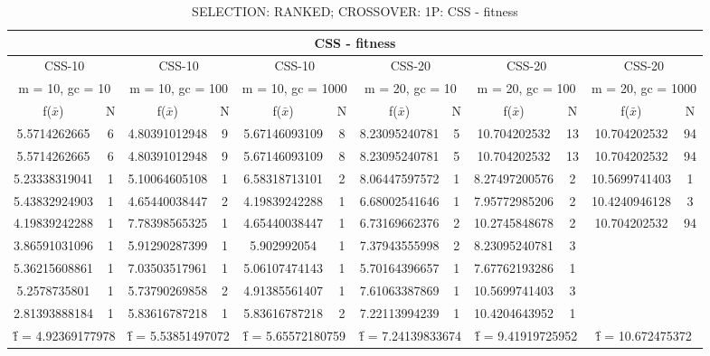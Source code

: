 \begin{table}[H]
	\centering
	\caption{SELECTION: RANKED; CROSSOVER: 1P: CSS - fitness}
	\begin{adjustbox}{width=1\textwidth}
		\begin{tabular}{ |c|c||c|c||c|c||c|c||c|c||c|c| }
			\hline
			\multicolumn{12}{|c|}{CSS - fitness} \\
			\hline
			\multicolumn{2}{|c||}{CSS-10} & \multicolumn{2}{c||}{CSS-10} & \multicolumn{2}{c||}{CSS-10} & \multicolumn{2}{c||}{CSS-20} & \multicolumn{2}{c||}{CSS-20} & \multicolumn{2}{c|}{CSS-20}\\
			\hline
			\multicolumn{2}{|c||}{m = 10, gc = 10} & \multicolumn{2}{c||}{m = 10, gc = 100} & \multicolumn{2}{c||}{m = 10, gc = 1000} & \multicolumn{2}{c||}{m = 20, gc = 10} & \multicolumn{2}{c||}{m = 20, gc = 100} & \multicolumn{2}{c|}{m = 20, gc = 1000}\\
			\hline
			f($\bar{x}$) & N & f($\bar{x}$) & N & f($\bar{x}$) & N & f($\bar{x}$) & N & f($\bar{x}$) & N & f($\bar{x}$) & N\\
			\hline
			\hline
			5.5714262665 & 6 & 4.80391012948 & 9 & 5.67146093109 & 8 & 8.23095240781 & 5 & 10.704202532 & 13 & 10.704202532 & 94\\
			\hline
			5.5714262665 & 6 & 4.80391012948 & 9 & 5.67146093109 & 8 & 8.23095240781 & 5 & 10.704202532 & 13 & 10.704202532 & 94\\
			5.23338319041 & 1 & 5.10064605108 & 1 & 6.58318713101 & 2 & 8.06447597572 & 1 & 8.27497200576 & 2 & 10.5699741403 & 1\\
			5.43832924903 & 1 & 4.65440038447 & 2 & 4.19839242288 & 1 & 6.68002541646 & 1 & 7.95772985206 & 2 & 10.4240946128 & 3\\
			4.19839242288 & 1 & 7.78398565325 & 1 & 4.65440038447 & 1 & 6.73169662376 & 2 & 10.2745848678 & 2 & 10.704202532 & 94\\
			3.86591031096 & 1 & 5.91290287399 & 1 & 5.902992054 & 1 & 7.37943555998 & 2 & 8.23095240781 & 3 &   &  \\
			5.36215608861 & 1 & 7.03503517961 & 1 & 5.06107474143 & 1 & 5.70164396657 & 1 & 7.67762193286 & 1 &   &  \\
			5.2578735801 & 1 & 5.73790269858 & 2 & 4.91385561407 & 1 & 7.61063387869 & 1 & 10.5699741403 & 3 &   &  \\
			2.81393888184 & 1 & 5.83616787218 & 1 & 5.83616787218 & 2 & 7.22113994239 & 1 & 10.4204643952 & 1 &   &  \\
			\hline
			\multicolumn{2}{|c||}{\^{f} = 4.92369177978} & \multicolumn{2}{c||}{\^{f} = 5.53851497072} & \multicolumn{2}{c||}{\^{f} = 5.65572180759} & \multicolumn{2}{c||}{\^{f} = 7.24139833674} & \multicolumn{2}{c||}{\^{f} = 9.41919725952} & \multicolumn{2}{c|}{\^{f} = 10.672475372}\\
			\hline
		\end{tabular}
	\end{adjustbox}
\end{table}
